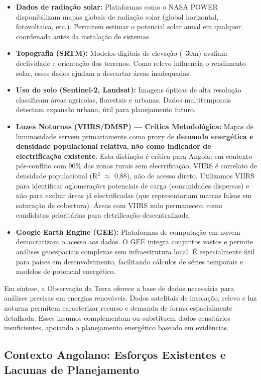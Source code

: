 \documentclass[12pt, a4paper]{article}
\begin{document}
\begin{itemize}
\begin{itemize}
\item \textbf{Dados de radiação solar:} Plataformas como o NASA POWER disponibilizam mapas globais de radiação solar (global horizontal, fotovoltaica, etc.). Permitem estimar o potencial solar anual em qualquer coordenada antes da instalação de sistemas.
\item \textbf{Topografia (SRTM):} Modelos digitais de elevação (~30m) avaliam declividade e orientação dos terrenos. Como relevo influencia o rendimento solar, esses dados ajudam a descartar áreas inadequadas.
\item \textbf{Uso do solo (Sentinel-2, Landsat):} Imagens ópticas de alta resolução classificam áreas agrícolas, florestais e urbanas. Dados multitemporais detectam expansão urbana, útil para planejamento futuro.
\item \textbf{Luzes Noturnas (VIIRS/DMSP) — Crítica Metodológica:} Mapas de luminosidade servem primariamente como proxy de \textbf{demanda energética e densidade populacional relativa}, \textbf{não como indicador de electrificação existente}. Esta distinção é crítica para Angola: em contexto pós-conflito com 90\% das zonas rurais sem electrificação, VIIRS é correlato de densidade populacional (R$^2$ $\approx$ 0,88), não de acesso direto. Utilizamos VIIRS para identificar aglomerações potenciais de carga (comunidades dispersas) e não para excluir áreas já electrificadas (que representariam marcas falsas em saturação de cobertura). Áreas com VIIRS nulo permanecem como candidatas prioritárias para eletrificação descentralizada.
\item \textbf{Google Earth Engine (GEE):} Plataformas de computação em nuvem democratizam o acesso aos dados. O GEE integra conjuntos vastos e permite análises geoespaciais complexas sem infraestrutura local. É especialmente útil para países em desenvolvimento, facilitando cálculos de séries temporais e modelos de potencial energético.
\end{itemize}

Em síntese, a Observação da Terra oferece a base de dados necessária para análises precisas em energias renováveis. Dados satelitais de insolação, relevo e luz noturna permitem caracterizar recurso e demanda de forma espacialmente detalhada. Esses insumos complementam ou substituem dados censitários insuficientes, apoiando o planejamento energético baseado em evidências.

\subsection{Contexto Angolano: Esforços Existentes e Lacunas de Planejamento}


\end{itemize}
\end{document}
